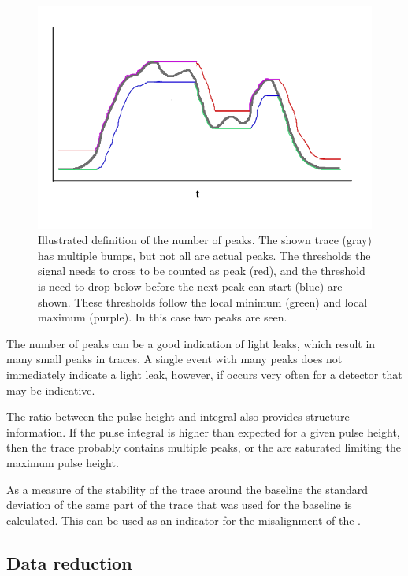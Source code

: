 \begin{figure}
    \centering
    \includegraphics[width=0.7\linewidth]{plots/processing/n_peaks}
    \caption{Illustrated definition of the number of peaks. The shown trace (gray) has multiple bumps, but not all are actual peaks. The thresholds the signal needs to cross to be counted as peak (red), and the threshold is need to drop below before the next peak can start (blue) are shown. These thresholds follow the local minimum (green) and local maximum (purple). In this case two peaks are seen.}
    \label{fig:n_peaks}
\end{figure}

The number of peaks can be a good indication of light leaks, which result in many small peaks in traces. A single event with many peaks does not immediately indicate a light leak, however, if occurs very often for a detector that may be indicative.

The ratio between the pulse height and integral also provides structure information. If the pulse integral is higher than expected for a given pulse height, then the trace probably contains multiple peaks, or the \adcs are saturated limiting the maximum pulse height.

As a measure of the stability of the trace around the baseline the standard deviation of the same part of the trace that was used for the baseline is calculated. This can be used as an indicator for the misalignment of the \adcs.


\subsection{Data reduction}

